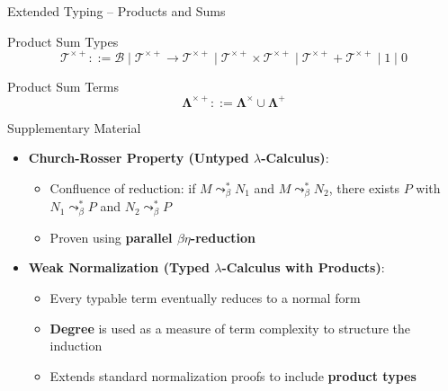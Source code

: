 \documentclass[aspectratio=169]{beamer}
\newcommand{\La}{\mathbf{\Lambda}}
\newcommand{\Bset}{\mathcal{B}}
\newcommand{\Tset}{\mathcal{T}}
\newcommand{\curly}{\mathrel{\leadsto}_\beta}
\begin{document}
\begin{frame}{Extended Typing -- Products and Sums}
  \begin{block}{Product Sum Types}
    \[
      \Tset^{\times+} ::= \Bset 
      \mid \Tset^{\times+} \to \Tset^{\times+} 
      \mid \Tset^{\times+} \times \Tset^{\times+} 
      \mid \Tset^{\times+} + \Tset^{\times+} 
      \mid 1 
      \mid 0
    \]
  \end{block}
  \begin{block}{Product Sum Terms}
    \[
      \La^{\times+} ::= \La^\times \cup \La^+ 
    \]
  \end{block}
\end{frame}

\begin{frame}{Supplementary Material}
  \begin{itemize}
  \item \textbf{Church-Rosser Property (Untyped $\lambda$-Calculus)}:
    \begin{itemize}
    \item Confluence of reduction: if $M \curly^* N_1$ and $M \curly^* N_2$, there exists $P$ with $N_1 \curly^* P$ and $N_2 \curly^* P$
    \item Proven using \textbf{parallel $\beta\eta$-reduction}
    \end{itemize}
  \item \textbf{Weak Normalization (Typed $\lambda$-Calculus with Products)}:
    \begin{itemize}
    \item Every typable term eventually reduces to a normal form
    \item \textbf{Degree} is used as a measure of term complexity to structure the induction
    \item Extends standard normalization proofs to include \textbf{product types}
    \end{itemize}
  \end{itemize}
\end{frame}
\end{document}
